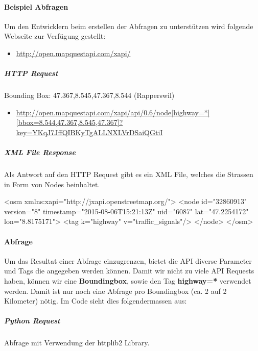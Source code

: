 \paragraph{Beispiel Abfragen}
Um den Entwicklern beim erstellen der Abfragen zu unterstützen wird folgende Webseite zur Verfügung gestellt:
\begin{itemize}
	\item \url{http://open.mapquestapi.com/xapi/}
\end{itemize}

\subparagraph{HTTP Request}
Bounding Box:  47.367,8.545,47.367,8.544 (Rapperswil)
\begin{itemize}
	\item \url{http://open.mapquestapi.com/xapi/api/0.6/node[highway=*][bbox=8.544,47.367,8.545,47.367]?key=YKqJ7JffQIBKyTgALLNXLVrDSaiQGtiI}
\end{itemize}


\subparagraph{XML File Response}
Als Antwort auf den HTTP Request gibt es ein XML File, welches die Strassen in Form von Nodes beinhaltet.\\

\begin{python}
	<osm xmlns:xapi="http://jxapi.openstreetmap.org/">
	<node id="32860913" version="8"
	timestamp="2015-08-06T15:21:13Z" uid="6087"
	lat="47.2254172" lon="8.8175171">
	<tag k="highway" v="traffic_signals"/>
	</node>
	</osm>
\end{python}



\paragraph{Abfrage}
Um das Resultat einer Abfrage einzugrenzen, bietet die API diverse Parameter und Tags die angegeben werden können. Damit wir nicht zu viele API Requests haben, können wir eine \textbf{Boundingbox}, sowie den Tag \textbf{highway=*} verwendet werden. Damit ist nur noch eine Abfrage pro Boundingbox (ca. 2 auf 2 Kilometer) nötig. Im Code sieht dies folgendermassen aus:
\subparagraph{Python Request} Abfrage mit Verwendung der httplib2 Library. \\ 
\begin{python}
import httplib2

url =  'http://open.mapquestapi.com/xapi/api/0.6/node
		[highway=*][bbox=8.544,47.367,8.545,47.367]?
		key=YKqJ7JffQIBKyTgALLNXLVrDSaiQGtiI}'
resp, content = httplib2.Http().request(url)
\end{python}

